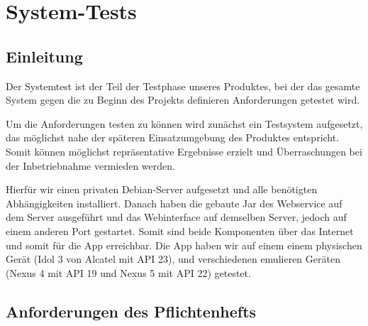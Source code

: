 \section{System-Tests}

\subsection{Einleitung}
Der Systemtest ist der Teil der Testphase unseres Produktes, bei der das gesamte System gegen die zu Beginn des Projekts definieren Anforderungen getestet wird. \par 
Um die Anforderungen testen zu können wird zunächst ein Testsystem aufgesetzt, das möglichst nahe der späteren Einsatzumgebung des Produktes entspricht. Somit können möglichst repräsentative Ergebnisse erzielt und Überraschungen bei der Inbetriebnahme vermieden werden. \par
Hierfür wir einen privaten Debian-Server aufgesetzt und alle benötigten Abhängigkeiten installiert. Danach haben die gebaute Jar des Webservice auf dem Server ausgeführt und das Webinterface auf demselben Server, jedoch auf einem anderen Port gestartet. Somit sind beide Komponenten über das Internet und somit für die App erreichbar. Die App haben wir auf einem einem physischen Gerät (Idol 3 von Alcatel mit API 23), und verschiedenen emulieren Geräten (Nexus 4 mit API 19 und Nexus 5 mit API 22) getestet.

 \subsection{Anforderungen des Pflichtenhefts} \label{funcspec}

